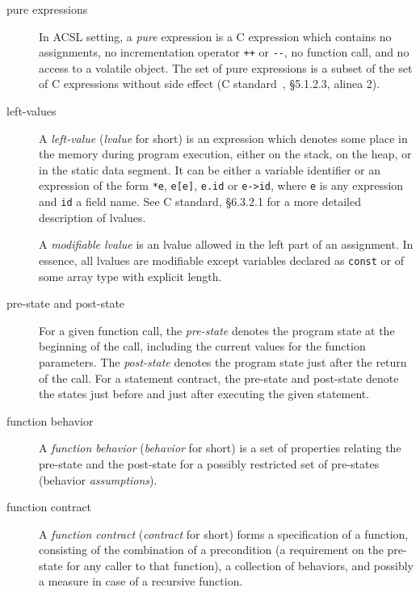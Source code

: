 \documentclass[web]{frama-c-book}
\begin{document}
\begin{description}
\item[pure expressions]  In ACSL setting, a
  \emph{pure} expression is a C expression which contains no assignments, no
  incrementation operator \lstinline|++| or \lstinline|--|, no function call,
  and no access to a volatile object. The set of pure expressions is a
  subset of the set of C expressions without side effect (C
  standard~\cite{KR88,standardc99}, \S 5.1.2.3, alinea 2).

\item[left-values] 

  A \emph{left-value} (\emph{lvalue} for short) is an expression which
  denotes some place in the memory during program execution, either on
  the stack, on the heap, or in the static data segment. It can be
  either a variable identifier or an expression of the form \lstinline|*e|,
  \lstinline|e[e]|, \lstinline|e.id| or \lstinline|e->id|, where
  \lstinline |e| is any expression and \lstinline|id| a field name.
  See C standard, \S 6.3.2.1 for a more
  detailed description of lvalues.

  A \emph{modifiable lvalue} is an lvalue allowed in the left part of
  an assignment. In essence, all lvalues are modifiable except
  variables declared as \texttt{const} or of some array type with
  explicit length.

\item[pre-state and post-state]

    For a given function call, the \emph{pre-state} denotes the
    program state at the beginning of the call, including the
    current values for the function parameters. The \emph{post-state}
    denotes the program state just after the return of the call.
    For a statement contract, the pre-state and post-state denote the
    states just before and just after executing the given statement.

\item[function behavior]  

  A \emph{function behavior} (\emph{behavior} for short) is a set of
  properties relating the pre-state and the post-state for a
  possibly restricted set of pre-states (behavior \emph{assumptions}).

\item[function contract]  

  A \emph{function contract} (\emph{contract} for short) forms a
  specification of a function, consisting of the combination of a
  precondition (a requirement on the pre-state for any caller to that
  function), a collection of behaviors, and possibly a measure in case
  of a recursive function.

\end{description}
\end{document}
